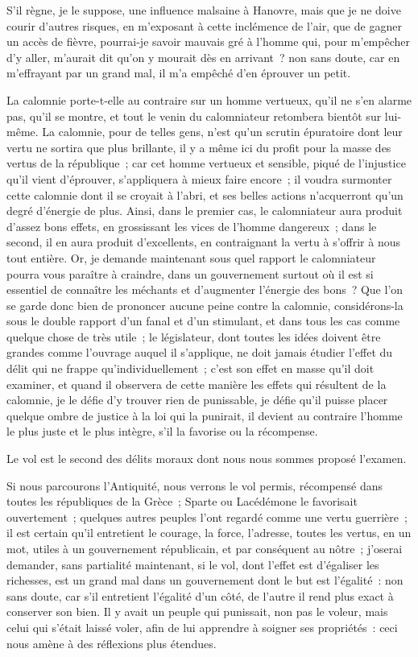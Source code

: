 \documentclass[french,twoside]{book} %
\begin{document}
S’il règne, je le suppose, une influence malsaine à Hanovre, mais que je ne doive courir d’autres risques, en m’exposant à cette inclémence de l’air, que de gagner un accès de fièvre, pourrai-je savoir mauvais gré à l’homme qui, pour m’empêcher d’y aller, m’aurait dit qu’on y mourait dès en arrivant ? non sans doute, car en m’effrayant par un grand mal, il m’a empêché d’en éprouver un petit.\par
La calomnie porte-t-elle au contraire sur un homme vertueux, qu’il ne s’en alarme pas, qu’il se montre, et tout le venin du calomniateur retombera bientôt sur lui-même. La calomnie, pour de telles gens, n’est qu’un scrutin épuratoire dont leur vertu ne sortira que plus brillante, il y a même ici du profit pour la masse des vertus de la république ; car cet homme vertueux et sensible, piqué de l’injustice qu’il vient d’éprouver, s’appliquera à mieux faire encore ; il voudra surmonter cette calomnie dont il se croyait à l’abri, et ses belles actions n’acquerront qu’un degré d’énergie de plus. Ainsi, dans le premier cas, le calomniateur aura produit d’assez bons effets, en grossissant les vices de l’homme dangereux ; dans le second, il en aura produit d’excellents, en contraignant la vertu à s’offrir à nous tout entière. Or, je demande maintenant sous quel rapport le calomniateur pourra vous paraître à craindre, dans un gouvernement surtout où il est si essentiel de connaître les méchants et d’augmenter l’énergie des bons ? Que l’on se garde donc bien de prononcer aucune peine contre la calomnie, considérons-la sous le double rapport d’un fanal et d’un stimulant, et dans tous les cas comme quelque chose de très utile ; le législateur, dont toutes les idées doivent être grandes comme l’ouvrage auquel il s’applique, ne doit jamais étudier l’effet du délit qui ne frappe qu’individuellement ; c’est son effet en masse qu’il doit examiner, et quand il observera de cette manière les effets qui résultent de la calomnie, je le défie d’y trouver rien de punissable, je défie qu’il puisse placer quelque ombre de justice à la loi qui la punirait, il devient au contraire l’homme le plus juste et le plus intègre, s’il la favorise ou la récompense.\par
Le vol est le second des délits moraux dont nous nous sommes proposé l’examen.\par
Si nous parcourons l’Antiquité, nous verrons le vol permis, récompensé dans toutes les républiques de la Grèce ; Sparte ou Lacédémone le favorisait ouvertement ; quelques autres peuples l’ont regardé comme une vertu guerrière ; il est certain qu’il entretient le courage, la force, l’adresse, toutes les vertus, en un mot, utiles à un gouvernement républicain, et par conséquent au nôtre ; j’oserai demander, sans partialité maintenant, si le vol, dont l’effet est d’égaliser les richesses, est un grand mal dans un gouvernement dont le but est l’égalité : non sans doute, car s’il entretient l’égalité d’un côté, de l’autre il rend plus exact à conserver son bien. Il y avait un peuple qui punissait, non pas le voleur, mais celui qui s’était laissé voler, afin de lui apprendre à soigner ses propriétés : ceci nous amène à des réflexions plus étendues.\par
\end{document}
